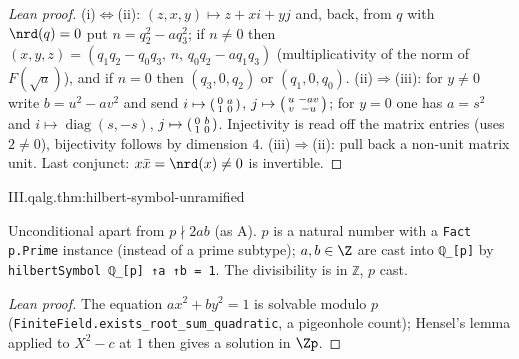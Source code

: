 \begin{proof}[Lean proof]
(i)$\iff$(ii): $(z,x,y)\mapsto z+xi+yj$ and, back, from $q$ with $\nrd(q)=0$ put $n=q_2^2-aq_3^2$; if $n\neq0$ then $(x,y,z)=(q_1q_2-q_0q_3,\,n,\,q_0q_2-aq_1q_3)$ (multiplicativity of the norm of $F(\sqrt a)$), and if $n=0$ then $(q_3,0,q_2)$ or $(q_1,0,q_0)$. (ii)$\Rightarrow$(iii): for $y\neq0$ write $b=u^2-av^2$ and send $i\mapsto\begin{psmallmatrix}0&a\\1&0\end{psmallmatrix}$, $j\mapsto\begin{psmallmatrix}u&-av\\v&-u\end{psmallmatrix}$; for $y=0$ one has $a=s^2$ and $i\mapsto\operatorname{diag}(s,-s)$, $j\mapsto\begin{psmallmatrix}0&b\\1&0\end{psmallmatrix}$. Injectivity is read off the matrix entries (uses $2\neq0$), bijectivity follows by dimension $4$. (iii)$\Rightarrow$(ii): pull back a non-unit matrix unit. Last conjunct: $x\bar x=\nrd(x)\neq0$ is invertible.
\end{proof}

\begin{theorem}
\end{theorem}
\begin{tfformal}{III.qalg.thm:hilbert-symbol-unramified}
\begin{tffidelity}
Unconditional apart from $p\nmid2ab$ (as A). $p$ is a natural number with a \texttt{Fact p.Prime} instance (instead of a prime subtype); $a,b\in\Z$ are cast into \texttt{ℚ\_[p]} by \texttt{hilbertSymbol ℚ\_[p] ↑a ↑b = 1}. The divisibility is in \texttt{ℤ}, $p$ cast.
\end{tffidelity}
\end{tfformal}
\begin{proof}[Lean proof]
The equation $ax^2+by^2=1$ is solvable modulo $p$ (\texttt{FiniteField.exists\_root\_sum\_quadratic}, a pigeonhole count); Hensel's lemma applied to $X^2-c$ at $1$ then gives a solution in $\Zp$.
\end{proof}

